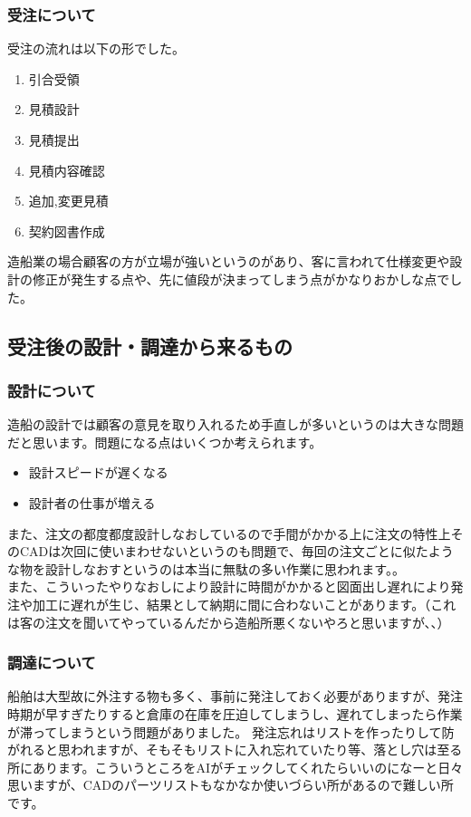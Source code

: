 \documentclass[dvipdfmx,a4paper]{jsarticle}
\begin{document}
\subsubsection{受注について}
受注の流れは以下の形でした。
\begin{enumerate}
    \item 引合受領
    \item 見積設計
    \item 見積提出
    \item 見積内容確認
    \item 追加,変更見積
    \item 契約図書作成
\end{enumerate}
造船業の場合顧客の方が立場が強いというのがあり、客に言われて仕様変更や設計の修正が発生する点や、先に値段が決まってしまう点がかなりおかしな点でした。

\subsection{受注後の設計・調達から来るもの}
\subsubsection{設計について}
造船の設計では顧客の意見を取り入れるため手直しが多いというのは大きな問題だと思います。問題になる点はいくつか考えられます。
\begin{itemize}
    \item 設計スピードが遅くなる
    \item 設計者の仕事が増える
\end{itemize}
また、注文の都度都度設計しなおしているので手間がかかる上に注文の特性上そのCADは次回に使いまわせないというのも問題で、毎回の注文ごとに似たような物を設計しなおすというのは本当に無駄の多い作業に思われます。。\\
また、こういったやりなおしにより設計に時間がかかると図面出し遅れにより発注や加工に遅れが生じ、結果として納期に間に合わないことがあります。（これは客の注文を聞いてやっているんだから造船所悪くないやろと思いますが、、）

\subsubsection{調達について}

船舶は大型故に外注する物も多く、事前に発注しておく必要がありますが、発注時期が早すぎたりすると倉庫の在庫を圧迫してしまうし、遅れてしまったら作業が滞ってしまうという問題がありました。
発注忘れはリストを作ったりして防がれると思われますが、そもそもリストに入れ忘れていたり等、落とし穴は至る所にあります。こういうところをAIがチェックしてくれたらいいのになーと日々思いますが、CADのパーツリストもなかなか使いづらい所があるので難しい所です。
\end{document}

